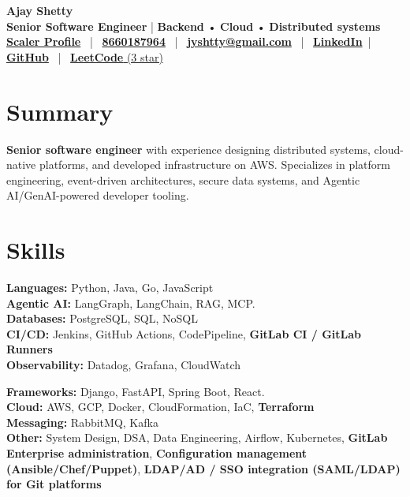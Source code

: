 \documentclass[11 pt]{article}
\begin{document}
\begin{center}
    {\LARGE \textbf{Ajay Shetty}} \\[4pt]
    \textbf{Senior Software Engineer} | \textbf{Backend} • \textbf{Cloud} • \textbf{ Distributed systems} \\[6pt]

    \href{https://www.scaler.com/academy/profile/e30cd4a603ce/}{\textbf{Scaler Profile}} \, | \,
    \href{tel:8660187964}{\textbf{8660187964}} \, | \,
    \href{mailto:jyshtty@gmail.com}{\textbf{jyshtty@gmail.com}} \, | \,
    \href{https://www.linkedin.com/in/ajay-shetty-2b5901ab/}{\textbf{LinkedIn}} \,|\,
    \href{https://github.com/jyshtty}{\textbf{GitHub}} \, | \,
    \href{https://leetcode.com/u/jyshtty/}{\textbf{LeetCode} (3 star)}
\end{center}

\section*{\textbf{Summary}}
\textbf{Senior software engineer}  with experience designing distributed systems, cloud-native platforms, and developed infrastructure on AWS. Specializes in platform engineering, event-driven architectures, secure data systems, and Agentic AI/GenAI-powered developer tooling.



\section*{\textbf{Skills}}

\noindent
\begin{minipage}[t]{0.48\textwidth}
\textbf{Languages:} Python, Java, Go, JavaScript \\[1pt]
\textbf{Agentic AI:} LangGraph, LangChain, RAG, MCP. \\[1pt]
\textbf{Databases:} PostgreSQL, SQL, NoSQL \\[1pt]
\textbf{CI/CD:} Jenkins, GitHub Actions, CodePipeline, \textbf{GitLab CI / GitLab Runners} \\[1pt]
\textbf{Observability:} Datadog, Grafana, CloudWatch
\end{minipage}
\hfill
\begin{minipage}[t]{0.48\textwidth}
\textbf{Frameworks:} Django, FastAPI, Spring Boot, React.  \\[1pt]
\textbf{Cloud:} AWS, GCP, Docker, CloudFormation, IaC, \textbf{Terraform} \\[1pt]
\textbf{Messaging:} RabbitMQ, Kafka \\[1pt]
\textbf{Other:} System Design, DSA, Data Engineering, Airflow, Kubernetes, \textbf{GitLab Enterprise administration}, \textbf{Configuration management (Ansible/Chef/Puppet)}, \textbf{LDAP/AD / SSO integration (SAML/LDAP) for Git platforms}
\end{minipage}
\end{document}
